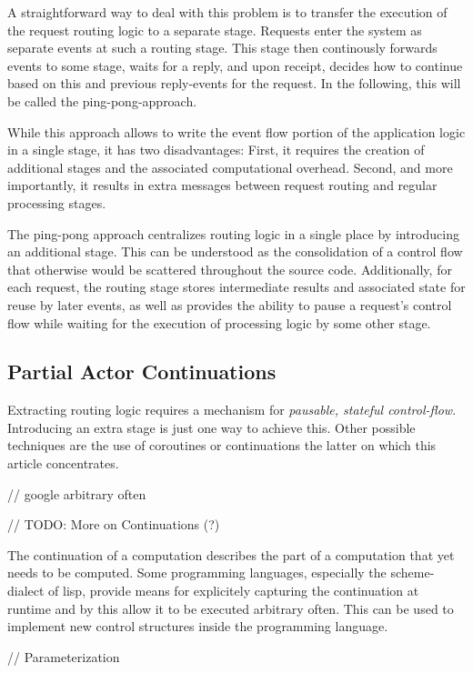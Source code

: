 \documentclass{sig-alternate}
\begin{document}
A straightforward way to deal with this problem is to transfer the execution of the request routing
logic to a separate stage. Requests enter the system as separate events at such a routing stage.
This stage then continously forwards events to some stage, waits for a reply, and upon receipt,
decides how to continue based on this and previous reply-events for the request. In the following,
this will be called the ping-pong-approach.

While this approach allows to write the event flow portion of the application logic in a single
stage, it has two disadvantages: First, it requires the creation of additional stages and the
associated computational overhead. Second, and more importantly, it results in extra messages
between request routing and regular processing stages.

The ping-pong approach centralizes routing logic in a single place by introducing an additional
stage. This can be understood as the consolidation of a control flow that otherwise would be
scattered throughout the source code. Additionally, for each request, the routing stage stores
intermediate results and associated state for reuse by later events, as well as provides the ability
to pause a request's control flow while waiting for the execution of processing logic by some other
stage.



\subsection{Partial Actor Continuations}

Extracting routing logic requires a mechanism for \emph{pausable, stateful control-flow}.
Introducing an extra stage is just one way to achieve this. Other possible techniques are the use of
coroutines or continuations the latter on which this article concentrates.
          

// google arbitrary often

// TODO: More on Continuations (?)

The continuation of a computation describes the part of a computation that yet needs to be computed.
Some programming languages, especially the scheme-dialect of lisp, provide means for explicitely
capturing the continuation at runtime and by this allow it to be executed arbitrary often.  This
can be used to implement new control structures inside the programming language.  

                                
// Parameterization
\end{document}
